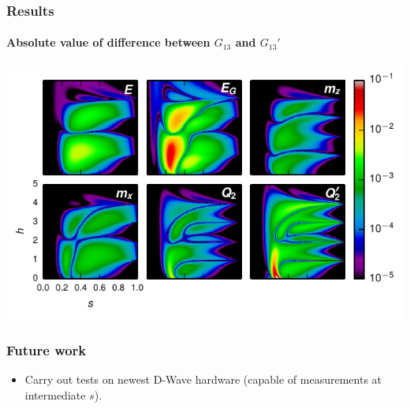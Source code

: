 \documentclass{beamer}
\begin{document}
\begin{frame}
  \frametitle{Results}
  \framesubtitle{Absolute value of difference between $G_{13}$ and $G_{13}'$}
  \includegraphics[width=\textwidth]{delta-grid}
\end{frame}
\begin{frame}
  \frametitle{Future work}
  \begin{itemize}
    \item Carry out tests on newest D-Wave hardware (capable of measurements at
      intermediate $s$).
  \end{itemize}
\end{frame}
\end{document}
